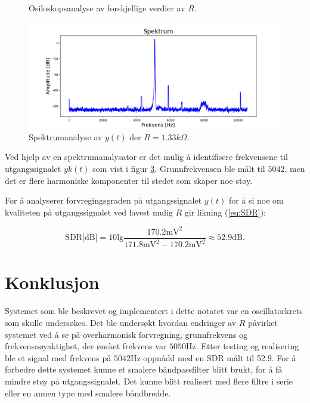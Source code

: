 \documentclass[a4paper,11pt,norsk]{article}
\begin{document}
\begin{figure}
\begin{subfigure}{0.45\linewidth}
    \caption{}
\label{fig:1a}
    \end{subfigure}
\caption{Osiloskopsanalyse av forskjellige verdier av $R$.}
    \label{fig:faseplott}
    \end{figure}

\begin{figure}[H]
  \centering
  \includegraphics[scale=0.442]{D1/Images/spectrum.png}
  \caption{Spektrumanalyse av $y(t)$ der $R = 1.33k\Omega$.}
  \label{fig:spectrum}
\end{figure}

Ved hjelp av en spektrumanalysator er det mulig å identifisere frekvensene til utgangssignalet $yk(t)$ som vist i figur \ref{fig:spectrum}. Grunnfrekvensen ble målt til $5042$, men det er flere harmoniske komponenter til stedet som skaper noe støy. 

For å analyserer forvregingsgraden på utgangssignalet $y(t)$ for å si noe om kvaliteten på utgangssignalet ved lavest mulig $R$ gir likning (\ref{eq:SDR}):

\begin{equation}
    \text{SDR[dB]} = 10\text{lg}\frac{170.2\text{mV}^2}{171.8\text{mV}^2-170.2\text{mV}^2} \approx 52.9\text{dB}.
    \label{eq:1}
\end{equation}

\section{Konklusjon}
\label{sec:konklusjon}
Systemet som ble beskrevet og implementert i dette notatet var en oscillatorkrets som skulle undersøkes. Det ble undersøkt hvordan endringer av $R$ påvirket systemet ved å se på overharmonisk forvregning, grunnfrekvens og frekvensnøyaktighet, der ønsket frekvens var $5050$Hz.
Etter testing og realisering ble et signal med frekvens på $5042$Hz oppnådd med en SDR målt til 52.9.
For å forbedre dette systemet kunne et smalere båndpassfilter blitt brukt, for å få mindre støy på utgangssignalet. Det kunne blitt realisert med flere filtre i serie eller en annen type med smalere båndbredde. 
\end{document}
